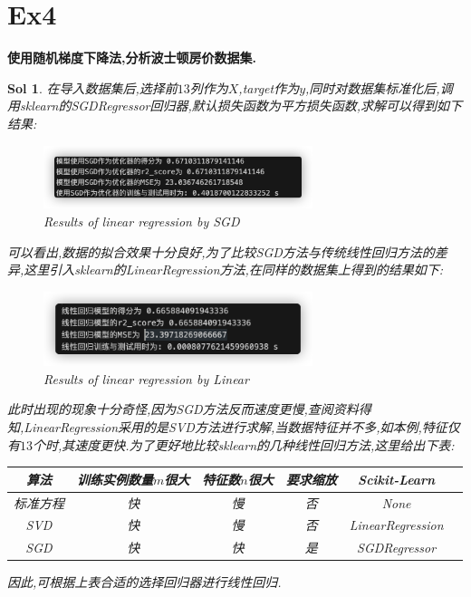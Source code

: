 \documentclass[UTF8,a4paper,11pt]{ctexart}
\newtheorem{sol}{Sol}[section]
\begin{document}
\section{Ex4}
\textbf{使用随机梯度下降法,分析波士顿房价数据集.}
\begin{sol}
在导入数据集后,选择前$13$列作为$X$,target作为$y$,同时对数据集标准化后,调用sklearn的SGDRegressor回归器,默认损失函数为平方损失函数,求解可以得到如下结果:
\begin{figure}[H]
	\centering
	\includegraphics[width=0.7\textwidth,height=0.2\textwidth]{SGD.png}
	\caption{Results of linear regression by SGD}
\end{figure}
可以看出,数据的拟合效果十分良好,为了比较SGD方法与传统线性回归方法的差异,这里引入sklearn的LinearRegression方法,在同样的数据集上得到的结果如下:
\begin{figure}[H]
	\centering
	\includegraphics[width=0.7\textwidth,height=0.2\textwidth]{Linear.png}
	\caption{Results of linear regression by Linear}
\end{figure}
此时出现的现象十分奇怪,因为SGD方法反而速度更慢,查阅资料得知,LinearRegression采用的是SVD方法进行求解,当数据特征并不多,如本例,特征仅有$13$个时,其速度更快.为了更好地比较sklearn的几种线性回归方法,这里给出下表:
\begin{center}
\begin{tabular}{cccccc}
	\hline
	算法 & 训练实例数量$m$很大 & 特征数$n$很大 & 要求缩放 & Scikit-Learn \\
	\hline
	标准方程 & 快 & 慢 & 否 & None \\
	
	SVD & 快 & 慢 & 否 & LinearRegression \\
	
	SGD & 快 & 快 & 是 & SGDRegressor \\
	\hline
\end{tabular}
\end{center}
因此,可根据上表合适的选择回归器进行线性回归.
\end{sol}
\end{document}
